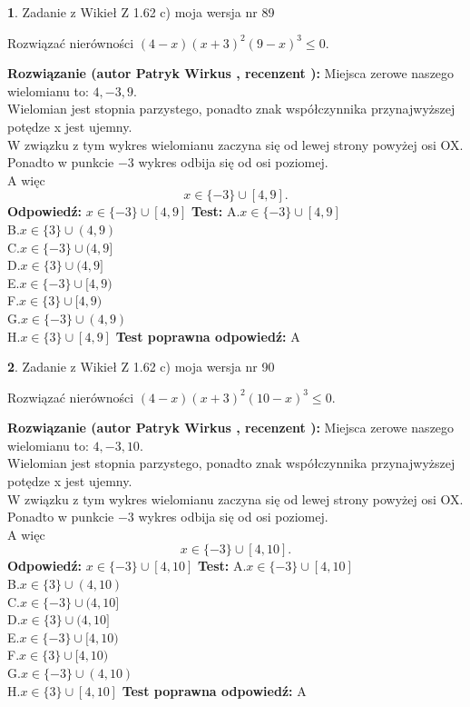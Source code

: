 \documentclass[12pt, a4paper]{article}
\theoremstyle{definition} %
\newtheorem{zad}{}
\newcommand{\zadStart}[1]{\begin{zad}#1\newline}
\newcommand{\zadStop}{\end{zad}}
\newcommand{\rozwStart}[2]{\noindent \textbf{Rozwiązanie (autor #1 , recenzent #2): }\newline}
\newcommand{\rozwStop}{\newline}
\newcommand{\odpStart}{\noindent \textbf{Odpowiedź:}\newline}
\newcommand{\odpStop}{\newline}
\newcommand{\testStart}{\noindent \textbf{Test:}\newline}
\newcommand{\testStop}{\newline}
\newcommand{\kluczStart}{\noindent \textbf{Test poprawna odpowiedź:}\newline}
\newcommand{\kluczStop}{\newline}
\begin{document}
\zadStart{Zadanie z Wikieł Z 1.62 c) moja wersja nr 89}

Rozwiązać nierówności $(4-x)(x+3)^{2}(9-x)^{3}\le0$.
\zadStop
\rozwStart{Patryk Wirkus}{}
Miejsca zerowe naszego wielomianu to: $4, -3, 9$.\\
Wielomian jest stopnia parzystego, ponadto znak współczynnika przy\linebreak najwyższej potędze x jest ujemny.\\ W związku z tym wykres wielomianu zaczyna się od lewej strony powyżej osi OX.\\
Ponadto w punkcie $-3$ wykres odbija się od osi poziomej.\\
A więc $$x \in \{-3\} \cup [4,9].$$
\rozwStop
\odpStart
$x \in \{-3\} \cup [4,9]$
\odpStop
\testStart
A.$x \in \{-3\} \cup [4,9]$\\
B.$x \in \{3\} \cup (4,9)$\\
C.$x \in \{-3\} \cup (4,9]$\\
D.$x \in \{3\} \cup (4,9]$\\
E.$x \in \{-3\} \cup [4,9)$\\
F.$x \in \{3\} \cup [4,9)$\\
G.$x \in \{-3\} \cup (4,9)$\\
H.$x \in \{3\} \cup [4,9]$
\testStop
\kluczStart
A
\kluczStop



\zadStart{Zadanie z Wikieł Z 1.62 c) moja wersja nr 90}

Rozwiązać nierówności $(4-x)(x+3)^{2}(10-x)^{3}\le0$.
\zadStop
\rozwStart{Patryk Wirkus}{}
Miejsca zerowe naszego wielomianu to: $4, -3, 10$.\\
Wielomian jest stopnia parzystego, ponadto znak współczynnika przy\linebreak najwyższej potędze x jest ujemny.\\ W związku z tym wykres wielomianu zaczyna się od lewej strony powyżej osi OX.\\
Ponadto w punkcie $-3$ wykres odbija się od osi poziomej.\\
A więc $$x \in \{-3\} \cup [4,10].$$
\rozwStop
\odpStart
$x \in \{-3\} \cup [4,10]$
\odpStop
\testStart
A.$x \in \{-3\} \cup [4,10]$\\
B.$x \in \{3\} \cup (4,10)$\\
C.$x \in \{-3\} \cup (4,10]$\\
D.$x \in \{3\} \cup (4,10]$\\
E.$x \in \{-3\} \cup [4,10)$\\
F.$x \in \{3\} \cup [4,10)$\\
G.$x \in \{-3\} \cup (4,10)$\\
H.$x \in \{3\} \cup [4,10]$
\testStop
\kluczStart
A
\kluczStop
\end{document}
